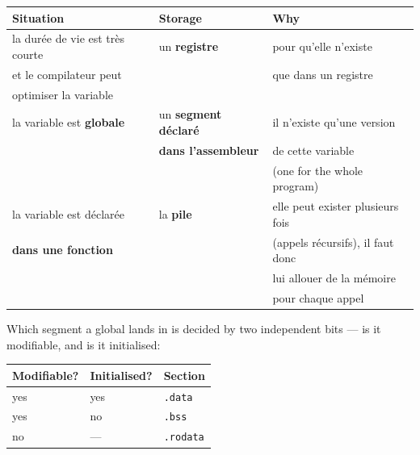 \begin{center}
\begin{tabular}{lll}
  \toprule
  Situation & Storage & Why \\
  \midrule
  la durée de vie est très courte & un \textbf{registre} & pour qu'elle n'existe \\
  et le compilateur peut          &                       & que dans un registre \\
  optimiser la variable           &                       & \\
  \addlinespace
  la variable est \textbf{globale} & un \textbf{segment déclaré} & il n'existe qu'une version \\
                                   & \textbf{dans l'assembleur}  & de cette variable \\
                                   &                             & (one for the whole program) \\
  \addlinespace
  la variable est déclarée & la \textbf{pile} & elle peut exister plusieurs fois \\
  \textbf{dans une fonction} &                & (appels récursifs), il faut donc \\
                             &                & lui allouer de la mémoire \\
                             &                & pour chaque appel \\
  \bottomrule
\end{tabular}
\end{center}

Which segment a global lands in is decided by two independent bits --- is it
modifiable, and is it initialised:

\begin{center}
\begin{tabular}{lll}
  \toprule
  Modifiable? & Initialised? & Section \\
  \midrule
  yes & yes & \verb|.data| \\
  yes & no  & \verb|.bss| \\
  no  & --- & \verb|.rodata| \\
  \bottomrule
\end{tabular}
\end{center}

